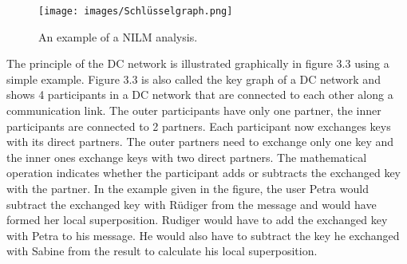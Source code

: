 \begin{figure}[tbp]
  \centering
  \texttt{[image: images/Schlüsselgraph.png]}
  \caption[Short description]{An example of a NILM analysis.}
  \label{fig:Appliance_Model}
\end{figure}
The principle of the DC network is illustrated graphically in figure 3.3 using a simple example. Figure 3.3 is also called the key graph of a DC network and shows 4 participants in a DC network that are connected to each other along a communication link. The outer participants have only one partner, the inner participants are connected to 2 partners. Each participant now exchanges keys with its direct partners. The outer partners need to exchange only one key and the inner ones exchange keys with two direct partners.
The mathematical operation indicates whether the participant adds or subtracts the exchanged key with the partner. In the example given in the figure, the user Petra would subtract the exchanged key with Rüdiger from the message and would have formed her local superposition. Rudiger would have to add the exchanged key with Petra to his message. He would also have to subtract the key he exchanged with Sabine from the result to calculate his local superposition. 

